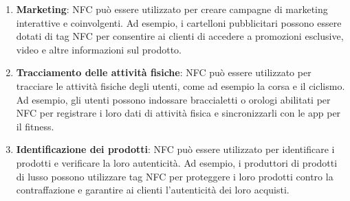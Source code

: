 \documentclass[a4paper,11pt]{report}
\begin{document}
\begin{enumerate}
    \item \textbf{Marketing}: NFC può essere utilizzato per creare campagne di marketing interattive e coinvolgenti. Ad esempio, i cartelloni pubblicitari possono essere dotati di tag NFC per consentire ai clienti di accedere a promozioni esclusive, video e altre informazioni sul prodotto.
    \item \textbf{Tracciamento delle attività fisiche}: NFC può essere utilizzato per tracciare le attività fisiche degli utenti, come ad esempio la corsa e il ciclismo. Ad esempio, gli utenti possono indossare braccialetti o orologi abilitati per NFC per registrare i loro dati di attività fisica e sincronizzarli con le app per il fitness.
    \item \textbf{Identificazione dei prodotti}: NFC può essere utilizzato per identificare i prodotti e verificare la loro autenticità. Ad esempio, i produttori di prodotti di lusso possono utilizzare tag NFC per proteggere i loro prodotti contro la contraffazione e garantire ai clienti l'autenticità dei loro acquisti.
\end{enumerate}
\end{document}
